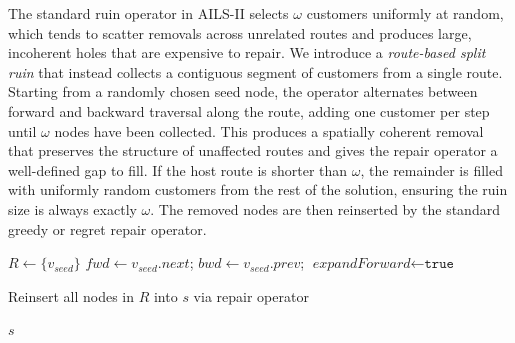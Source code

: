 The standard ruin operator in AILS-II selects $\omega$ customers uniformly at random, which tends to scatter removals across unrelated routes and produces large, incoherent holes that are expensive to repair.
We introduce a \emph{route-based split ruin} that instead collects a contiguous segment of customers from a single route.
Starting from a randomly chosen seed node, the operator alternates between forward and backward traversal along the route, adding one customer per step until $\omega$ nodes have been collected.
This produces a spatially coherent removal that preserves the structure of unaffected routes and gives the repair operator a well-defined gap to fill.
If the host route is shorter than $\omega$, the remainder is filled with uniformly random customers from the rest of the solution, ensuring the ruin size is always exactly $\omega$.
The removed nodes are then reinserted by the standard greedy or regret repair operator.

\begin{algorithm}[t]
\caption{Route-Based Split Ruin Perturbation}
\label{alg:ruinnew}

\BlankLine
{}

\BlankLine
{}
$R \leftarrow \{v_{\textit{seed}}\}$\;
$\textit{fwd} \leftarrow v_{\textit{seed}}.\textit{next}$;\quad
$\textit{bwd} \leftarrow v_{\textit{seed}}.\textit{prev}$;\quad
$\textit{expandForward} \leftarrow \texttt{true}$\;


\BlankLine
{}

\BlankLine
{}

\BlankLine
{}
Reinsert all nodes in $R$ into $s$ via repair operator\;

\BlankLine
\Return $s$\;
\end{algorithm}
